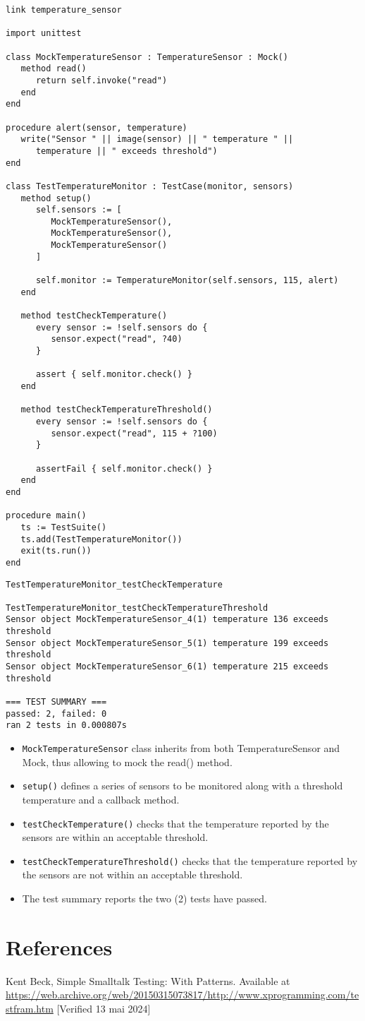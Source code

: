 \documentclass[letterpaper,12pt]{article}
\begin{document}
\bigskip{}
\begin{verbatim}
link temperature_sensor

import unittest

class MockTemperatureSensor : TemperatureSensor : Mock()
   method read()
      return self.invoke("read")
   end
end

procedure alert(sensor, temperature)
   write("Sensor " || image(sensor) || " temperature " ||
      temperature || " exceeds threshold")
end

class TestTemperatureMonitor : TestCase(monitor, sensors)
   method setup()
      self.sensors := [
         MockTemperatureSensor(),
         MockTemperatureSensor(),
         MockTemperatureSensor()
      ]

      self.monitor := TemperatureMonitor(self.sensors, 115, alert)
   end

   method testCheckTemperature()
      every sensor := !self.sensors do {
         sensor.expect("read", ?40)
      }

      assert { self.monitor.check() }
   end

   method testCheckTemperatureThreshold()
      every sensor := !self.sensors do {
         sensor.expect("read", 115 + ?100)
      }

      assertFail { self.monitor.check() }
   end
end

procedure main()
   ts := TestSuite()
   ts.add(TestTemperatureMonitor())
   exit(ts.run())
end
\end{verbatim}

\bigskip{}
\begin{verbatim}
TestTemperatureMonitor_testCheckTemperature

TestTemperatureMonitor_testCheckTemperatureThreshold
Sensor object MockTemperatureSensor_4(1) temperature 136 exceeds threshold
Sensor object MockTemperatureSensor_5(1) temperature 199 exceeds threshold
Sensor object MockTemperatureSensor_6(1) temperature 215 exceeds threshold

=== TEST SUMMARY ===
passed: 2, failed: 0
ran 2 tests in 0.000807s
\end{verbatim}

\begin{itemize}
   \item \texttt{MockTemperatureSensor} class inherits from both TemperatureSensor and Mock, thus allowing to mock the read() method.
   \item \texttt{setup()} defines a series of sensors to be monitored along with a threshold temperature and a callback method.
   \item \texttt{testCheckTemperature()} checks that the temperature reported by the sensors are within an acceptable threshold.
   \item \texttt{testCheckTemperatureThreshold()} checks that the temperature reported by the sensors are not within an acceptable threshold.
   \item The test summary reports the two (2) tests have passed.
\end{itemize}

\section*{References}

\noindent
[1] Kent Beck, Simple Smalltalk Testing: With Patterns. Available at \url{https://web.archive.org/web/20150315073817/http://www.xprogramming.com/testfram.htm} [Verified 13 mai 2024]
\end{document}
